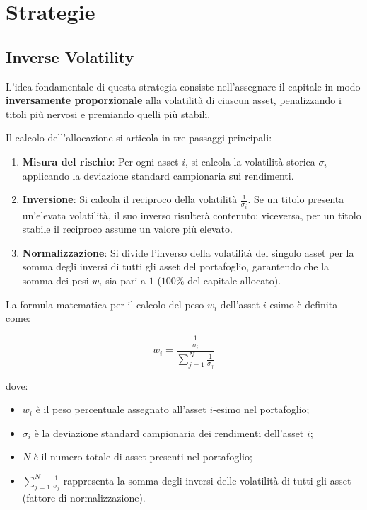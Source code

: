 \section{Strategie}
\label{set:strategie}

   \subsection{Inverse Volatility}
\label{sec:inverse_volatility}

L'idea fondamentale di questa strategia consiste nell'assegnare il capitale in modo \textbf{inversamente proporzionale} alla volatilità di ciascun asset, penalizzando i titoli più nervosi e premiando quelli più stabili.

Il calcolo dell'allocazione si articola in tre passaggi principali:
\begin{enumerate}
    \item \textbf{Misura del rischio}: Per ogni asset $i$, si calcola la volatilità storica $\sigma_i$ applicando la deviazione standard campionaria sui rendimenti.
    \item \textbf{Inversione}: Si calcola il reciproco della volatilità $\frac{1}{\sigma_i}$. Se un titolo presenta un'elevata volatilità, il suo inverso risulterà contenuto; viceversa, per un titolo stabile il reciproco assume un valore più elevato.
    \item \textbf{Normalizzazione}: Si divide l'inverso della volatilità del singolo asset per la somma degli inversi di tutti gli asset del portafoglio, garantendo che la somma dei pesi $w_i$ sia pari a $1$ ($100\%$ del capitale allocato).
\end{enumerate}

La formula matematica per il calcolo del peso $w_i$ dell'asset $i$-esimo è definita come:

\begin{equation}
    w_i = \frac{\frac{1}{\sigma_i}}{\sum_{j=1}^{N} \frac{1}{\sigma_j}}
\end{equation}

dove:
\begin{itemize}
    \item $w_i$ è il peso percentuale assegnato all'asset $i$-esimo nel portafoglio;
    \item $\sigma_i$ è la deviazione standard campionaria dei rendimenti dell'asset $i$;
    \item $N$ è il numero totale di asset presenti nel portafoglio;
    \item $\sum_{j=1}^{N} \frac{1}{\sigma_j}$ rappresenta la somma degli inversi delle volatilità di tutti gli asset (fattore di normalizzazione).
\end{itemize}

